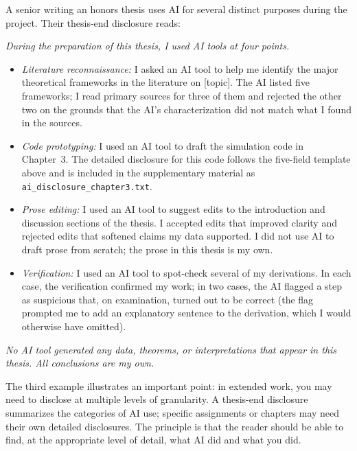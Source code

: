 \documentclass[11pt]{book}
\begin{document}
\begin{example}
A senior writing an honors thesis uses AI for several distinct purposes during the project. Their thesis-end disclosure reads:

\medskip
\noindent \emph{During the preparation of this thesis, I used AI tools at four points.}
\begin{itemize}\setlength{\itemsep}{1pt}
\item[(a)] \emph{Literature reconnaissance:} I asked an AI tool to help me identify the major theoretical frameworks in the literature on [topic]. The AI listed five frameworks; I read primary sources for three of them and rejected the other two on the grounds that the AI's characterization did not match what I found in the sources.
\item[(b)] \emph{Code prototyping:} I used an AI tool to draft the simulation code in Chapter~3. The detailed disclosure for this code follows the five-field template above and is included in the supplementary material as \texttt{ai\_disclosure\_chapter3.txt}.
\item[(c)] \emph{Prose editing:} I used an AI tool to suggest edits to the introduction and discussion sections of the thesis. I accepted edits that improved clarity and rejected edits that softened claims my data supported. I did not use AI to draft prose from scratch; the prose in this thesis is my own.
\item[(d)] \emph{Verification:} I used an AI tool to spot-check several of my derivations. In each case, the verification confirmed my work; in two cases, the AI flagged a step as suspicious that, on examination, turned out to be correct (the flag prompted me to add an explanatory sentence to the derivation, which I would otherwise have omitted).
\end{itemize}

\medskip
\noindent \emph{No AI tool generated any data, theorems, or interpretations that appear in this thesis. All conclusions are my own.}
\end{example}

The third example illustrates an important point: in extended work, you may need to disclose at multiple levels of granularity. A thesis-end disclosure summarizes the categories of AI use; specific assignments or chapters may need their own detailed disclosures. The principle is that the reader should be able to find, at the appropriate level of detail, what AI did and what you did.

\end{document}
